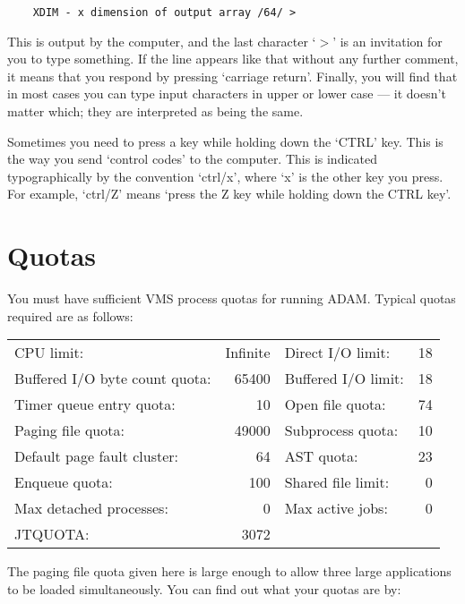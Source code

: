 \begin{small}
\begin{verbatim}
    XDIM - x dimension of output array /64/ >
\end{verbatim}
\end{small}

This is output by the computer, and the last character `$>$' is an invitation
for you to type something.
If the line appears like that without any further comment, it means that
you respond by pressing `carriage return'.
Finally, you will find that in most cases you can type input characters in
upper or lower case --- it doesn't matter which; they are interpreted as
being the same.

Sometimes you need to press a key while holding down the `CTRL' key.
This is the way you send `control codes' to the computer.
This is indicated typographically by the convention `ctrl/x', where `x' is
the other key you press.
For example, `ctrl/Z' means `press the Z key while holding down the CTRL key'.

\section{Quotas}
\label{S_quotas}

You must have sufficient VMS process quotas for running ADAM.
Typical quotas required are as follows:
\begin{center}
\begin{tabular}{|lr|lr|}
\hline
CPU limit: & Infinite & Direct I/O limit: & 18 \\
Buffered I/O byte count quota: & 65400 & Buffered I/O limit: & 18 \\
Timer queue entry quota: & 10 & Open file quota: & 74 \\
Paging file quota: & 49000 & Subprocess quota: & 10 \\
Default page fault cluster: & 64 & AST quota: & 23 \\
Enqueue quota: & 100 & Shared file limit: & 0 \\
Max detached processes: & 0 & Max active jobs: & 0 \\
JTQUOTA: & 3072 & & \\
\hline
\end{tabular}
\end{center}
The paging file quota given here is large enough to allow three large
applications to be loaded simultaneously.
You can find out what your quotas are by:

